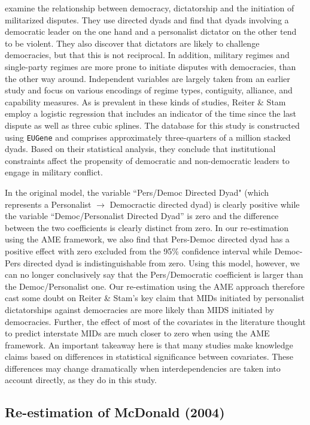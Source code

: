 \citet{reiter:stam:2003} examine the relationship between democracy, dictatorship and the initiation of militarized disputes.  They use directed dyads and find that dyads involving a democratic leader on the one hand and a personalist dictator on the other tend to be violent. They also discover that dictators are likely to challenge democracies, but that this is not reciprocal.  In addition, military regimes and single-party regimes are more prone to initiate disputes with democracies, than the other way around. Independent variables are largely taken from an earlier study and focus on various encodings of regime types, contiguity, alliance, and capability measures. As is prevalent in these kinds of studies, Reiter \& Stam employ a logistic regression that includes an indicator of the time since the last dispute as well as three cubic splines. The database for this study is constructed using \texttt{EUGene} \citep{bennett:stam:2000} and comprises approximately three-quarters of a million stacked dyads. Based on their statistical analysis, they conclude that institutional constraints affect the propensity of democratic and non-democratic leaders to engage in military conflict. 

In the original model, the variable ``Pers/Democ Directed Dyad" (which represents a Personalist $\rightarrow$ Democractic directed dyad) is clearly positive while the variable ``Democ/Personalist Directed Dyad'' is zero and the difference between the two coefficients is clearly distinct from zero. In our re-estimation using the AME framework, we also find that Pers-Democ directed dyad has a positive effect with zero excluded from the 95\% confidence interval while Democ-Pers directed dyad is indistinguishable from zero. Using this model, however, we can no longer conclusively say that the Pers/Democratic coefficient is larger than the Democ/Personalist one. Our re-estimation using the AME approach therefore cast some doubt on Reiter \& Stam's key claim that MIDs initiated by personalist dictatorships against democracies are more likely than MIDS initiated by democracies. Further, the effect of most of the covariates in the literature thought to predict interstate MIDs are much closer to zero when using the AME framework. An important takeaway here is that many studies make knowledge claims based on differences in statistical significance between covariates. These differences may change dramatically when interdependencies are taken into account directly, as they do in this study.

\subsection{Re-estimation of McDonald (2004)}

